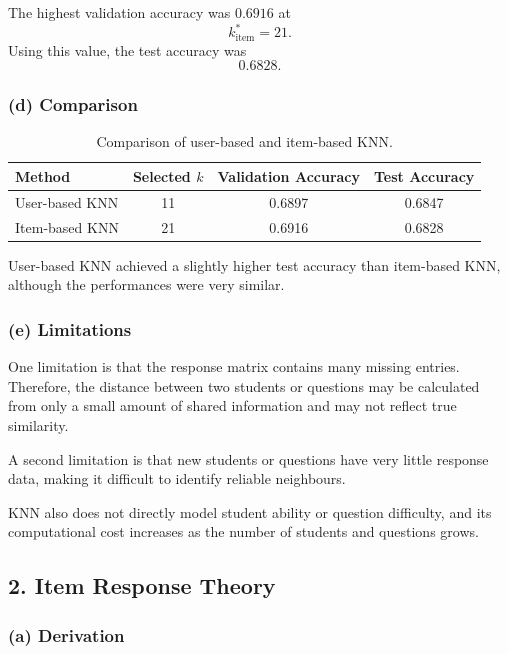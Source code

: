 \documentclass[11pt, letterpaper]{article}
\begin{document}
The highest validation accuracy was $0.6916$ at
\[
k^*_{\text{item}}=21.
\]
Using this value, the test accuracy was
\[
\boxed{0.6828}.
\]

\subsubsection*{(d) Comparison}

\begin{table}[H]
    \centering
    \begin{tabular}{lccc}
        \toprule
        Method & Selected $k$ & Validation Accuracy & Test Accuracy \\
        \midrule
        User-based KNN & 11 & 0.6897 & 0.6847 \\
        Item-based KNN & 21 & 0.6916 & 0.6828 \\
        \bottomrule
    \end{tabular}
    \caption{Comparison of user-based and item-based KNN.}
    \label{tab:knn_comparison}
\end{table}

User-based KNN achieved a slightly higher test accuracy than item-based KNN, although the performances were very similar.

\subsubsection*{(e) Limitations}

One limitation is that the response matrix contains many missing entries. Therefore, the distance between two students or questions may be calculated from only a small amount of shared information and may not reflect true similarity.

A second limitation is that new students or questions have very little response data, making it difficult to identify reliable neighbours.

KNN also does not directly model student ability or question difficulty, and its computational cost increases as the number of students and questions grows.
 
\subsection*{2. Item Response Theory}
 
\subsubsection*{(a) Derivation}
 
\end{document}
